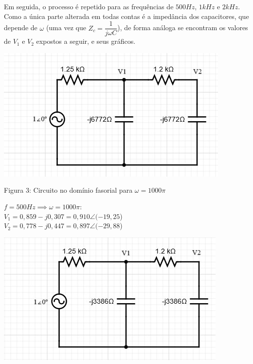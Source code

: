 \documentclass[a4 paper]{article}
\begin{document}
Em seguida, o processo é repetido para as frequências de $500Hz$, $1kHz$ e $2kHz$. Como a única parte alterada em todas contas é a impedância dos capacitores, que depende de $\omega$ (uma vez que $Z_c=\dfrac{1}{j\omega C}$), de forma análoga se encontram  os valores de $V_1$ e $V_2$ expostos a seguir, e seus gráficos.

\begin{table}[h]
\centering
\includegraphics[scale=0.6]{figuras/figura3}
\end{table}

\begin{center}
Figura 3: Circuito no domínio fasorial para $\omega=1000\pi$
\end{center}

$f=500Hz\implies \omega = 1000\pi:$\\\centering
$V_1=0,859-j0,307 = 0,910\angle(-19,25$\textdegree)\\
$V_2=0,778-j0,447=0,897\angle(-29,88$\textdegree)\\
\justifying

\begin{table}[h]
\centering
\includegraphics[scale=0.6]{figuras/figura4}
\end{table}
\end{document}

